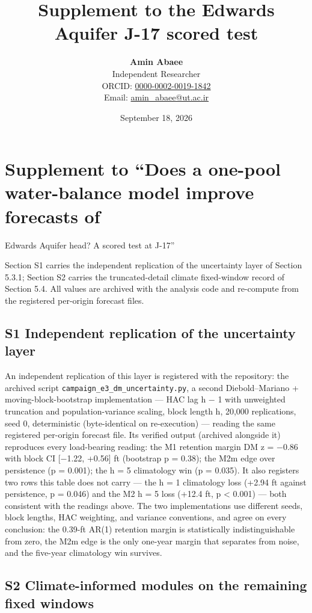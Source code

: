 \documentclass[11pt]{article}
\title{Supplement to the Edwards Aquifer J-17 scored test}
\author{\textbf{Amin Abaee}\\ Independent Researcher\\[2pt] ORCID: \href{https://orcid.org/0000-0002-0019-1842}{0000-0002-0019-1842}\\ Email: \href{mailto:amin_abaee@ut.ac.ir}{amin_abaee@ut.ac.ir}}
\date{September 18, 2026}
\begin{document}
\maketitle

\section{Supplement to ``Does a one-pool water-balance model improve
forecasts
of}\label{supplement-to-does-a-one-pool-water-balance-model-improve-forecasts-of}

Edwards Aquifer head? A scored test at J-17''

Section S1 carries the independent replication of the uncertainty layer
of Section 5.3.1; Section S2 carries the truncated-detail climate
fixed-window record of Section 5.4. All values are archived with the
analysis code and re-compute from the registered per-origin forecast
files.

\subsection{S1 Independent replication of the uncertainty
layer}\label{s1-independent-replication-of-the-uncertainty-layer}

An independent replication of this layer is registered with the
repository: the archived script
\texttt{campaign\_e3\_dm\_uncertainty.py}, a second Diebold--Mariano +
moving-block-bootstrap implementation --- HAC lag h − 1 with unweighted
truncation and population-variance scaling, block length h, 20,000
replications, seed 0, deterministic (byte-identical on re-execution) ---
reading the same registered per-origin forecast file. Its verified
output (archived alongside it) reproduces every load-bearing reading:
the M1 retention margin DM z = −0.86 with block CI {[}−1.22, +0.56{]} ft
(bootstrap p = 0.38); the M2m edge over persistence (p = 0.001); the h =
5 climatology win (p = 0.035). It also registers two rows this table
does not carry --- the h = 1 climatology loss (+2.94 ft against
persistence, p = 0.046) and the M2 h = 5 loss (+12.4 ft, p \textless{}
0.001) --- both consistent with the readings above. The two
implementations use different seeds, block lengths, HAC weighting, and
variance conventions, and agree on every conclusion: the 0.39-ft AR(1)
retention margin is statistically indistinguishable from zero, the M2m
edge is the only one-year margin that separates from noise, and the
five-year climatology win survives.

\subsection{S2 Climate-informed modules on the remaining fixed
windows}\label{s2-climate-informed-modules-on-the-remaining-fixed-windows}
\end{document}
